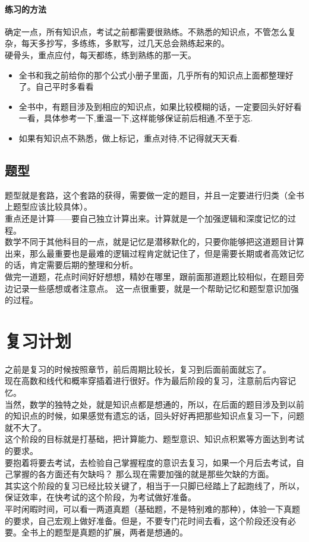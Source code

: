 \documentclass[a4paper]{ctexart}
\begin{document}
    \paragraph{练习的方法}
    确定一点，所有知识点，考试之前都需要很熟练。不熟悉的知识点，不管怎么复杂，每天{\heiti 多抄写，多练练，多默写}，过几天总会熟练起来的。\\
    硬骨头，重点应付，每天都练，练到熟练的那一天。
    \begin{itemize}
        \item 全书和我之前给你的那个公式小册子里面，几乎所有的知识点上面都整理好了。自己平时多看看
        \item 全书中，有题目涉及到相应的知识点，如果比较模糊的话，一定要回头好好看一看，具体参考一下,重温一下,这样能够保证前后相通,不至于忘.
        \item 如果有知识点不熟悉，做上标记，重点对待,不记得就天天看.
    \end{itemize}

    \subsection{题型}
    题型就是套路，这个套路的获得，需要做一定的题目，并且一定要进行归类（全书上题型应该比较具体）。\\
    重点还是计算——要自己独立计算出来。计算就是一个加强逻辑和深度记忆的过程。 \\
    数学不同于其他科目的一点，就是记忆是潜移默化的，只要你能够把这道题目计算出来，那么最重要也是最难的逻辑过程肯定就记住了，但是需要长期或者高效记忆的话，肯定需要后期的整理和分析。\\
    做完一道题，花点时间好好想想，精妙在哪里，跟前面那道题比较相似，在题目旁边记录一些感想或者注意点。 这一点很重要，就是一个帮助记忆和题型意识加强的过程。\\

\section{复习计划}
    之前是复习的时候按照章节，前后周期比较长，复习到后面前面就忘了。\\
    现在高数和线代和概率{\heiti 穿插着进行}很好。作为最后阶段的复习，注意前后内容记忆。\\
    当然，数学的独特之处，就是知识点都是想通的，所以，在后面的题目涉及到以前的知识点的时候，如果感觉有遗忘的话，回头好好再把那些知识点复习一下，问题就不大了。\\
    这个阶段的目标就是打基础，把计算能力、题型意识、知识点积累等方面达到考试的要求。\\
    要抱着将要去考试，去检验自己掌握程度的意识去复习，如果一个月后去考试，自己掌握的各方面还有欠缺吗？ 那么现在需要加强的就是那些欠缺的方面。\\
    其实这个阶段的复习已经比较关键了，相当于一只脚已经踏上了起跑线了，所以，保证效率，在快考试的这个阶段，为考试做好准备。\\
    平时闲暇时间，可以看一两道真题（基础题，不是特别难的那种），体验一下真题的要求，自己宏观上做好准备。但是，不要专门花时间去看，这个阶段还没有必要。全书上的题型是真题的扩展，两者是想通的。\\
\end{document}
